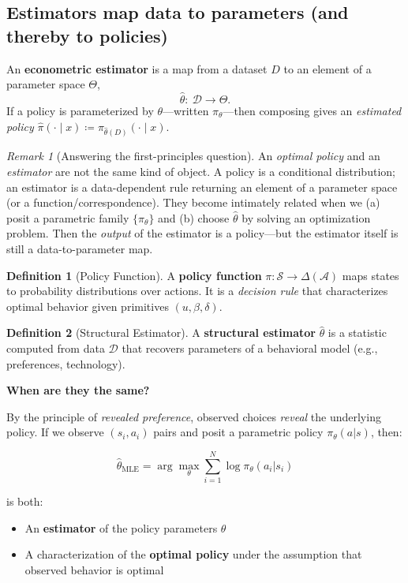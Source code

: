 \documentclass[11pt]{article}
\newcommand{\1}{\mathbf{1}}
\theoremstyle{plain}
\theoremstyle{definition}
\newtheorem{definition}{Definition}
\theoremstyle{remark}
\newtheorem{remark}{Remark}
\begin{document}
\subsection{Estimators map data to parameters (and thereby to policies)}
An \textbf{econometric estimator} is a map from a dataset $D$ to an element of a parameter space $\Theta$,
\[
\hat\theta:\ \mathcal{D}\to\Theta.
\]
If a policy is parameterized by $\theta$---written $\pi_\theta$---then composing gives an \emph{estimated policy}
$\hat\pi(\cdot\mid x)\coloneqq \pi_{\hat\theta(D)}(\cdot\mid x)$.

\begin{remark}[Answering the first-principles question]
An \emph{optimal policy} and an \emph{estimator} are not the same kind of object.
A policy is a conditional distribution; an estimator is a data-dependent rule returning an element of a parameter
space (or a function/correspondence). They become intimately related when we (a) posit a parametric family
$\{\pi_\theta\}$ and (b) choose $\hat\theta$ by solving an optimization problem. Then the \emph{output} of
the estimator is a policy---but the estimator itself is still a data-to-parameter map.
\end{remark}

\begin{definition}[Policy Function]
A \textbf{policy function} $\pi: \mathcal{S} \to \Delta(\mathcal{A})$ maps states to probability distributions over actions. It is a \emph{decision rule} that characterizes optimal behavior given primitives $(u, \beta, \delta)$.
\end{definition}

\begin{definition}[Structural Estimator]
A \textbf{structural estimator} $\hat{\theta}$ is a statistic computed from data $\mathcal{D}$ that recovers parameters of a behavioral model (e.g., preferences, technology).
\end{definition}

\noindent \textbf{When are they the same?}

By the principle of \emph{revealed preference}, observed choices \emph{reveal} the underlying policy. If we observe $(s_i, a_i)$ pairs and posit a parametric policy $\pi_\theta(a|s)$, then:

$$
\hat{\theta}_{\text{MLE}} = \arg\max_\theta \sum_{i=1}^N \log \pi_\theta(a_i | s_i)
$$

is both:
\begin{itemize}
\item An \textbf{estimator} of the policy parameters $\theta$
\item A characterization of the \textbf{optimal policy} under the assumption that observed behavior is optimal
\end{itemize}
\end{document}
